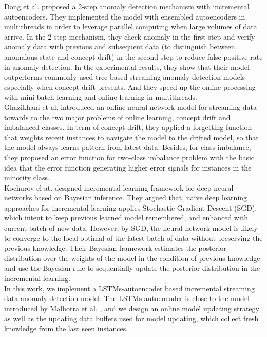 Dong et al. \cite{threaded} proposed a 2-step anomaly detection mechanism with incremental autoencoders. They implemented the model with ensembled autoencoders in multithreads in order to leverage parallel computing when large volumes of data arrive. In the 2-step mechanism, they check anomaly in the first step and verify anomaly data with previous and subsequent data (to distinguish between anomalous state and concept drift) in the second step to reduce false-positive rate in anomaly detection. In the experimental results, they show that their model outperforms commonly used tree-based streaming anomaly detection models especially when concept drift presents. And they speed up the online processing with mini-batch learning and online learning in multithreads.\\

Ghazikhani et al. \cite{onlinenn} introduced an online neural network model for streaming data towards to the two major problems of online learning, concept drift and imbalanced classes. In term of concept drift, they applied a forgetting function that weights recent instances to navigate the model to the drifted model, so that the model always learns pattern from latest data. Besides, for class imbalance, they proposed an error function for two-class imbalance problem with the basic idea that the error function generating higher error signals for instances in the minority class.\\

Kochurov el at. \cite{bayesian} designed incremental learning framework for deep neural networks based on Bayesian inference. They argued that, naïve deep learning approaches for incremental learning applies Stochastic Gradient Descent (SGD), which intent to keep previous learned model remembered, and enhanced with current batch of new data. However, by SGD, the neural network model is likely to converge to the local optimal of the latest batch of data without preserving the previous knowledge. Their Bayesian framework estimates the posterior distribution over the weights of the model in the condition of previous knowledge and use the Bayesian rule to sequentially update the posterior distribution in the incremental learning.\\

In this work, we implement a LSTMs-autoencoder based incremental streaming data anomaly detection model. The LSTMs-autoencoder is close to the model introduced by Malhotra et al. \cite{encdecad}, and we design an online model updating strategy as well as the updating data buffers used for model updating, which collect fresh knowledge from the last seen instances. 








